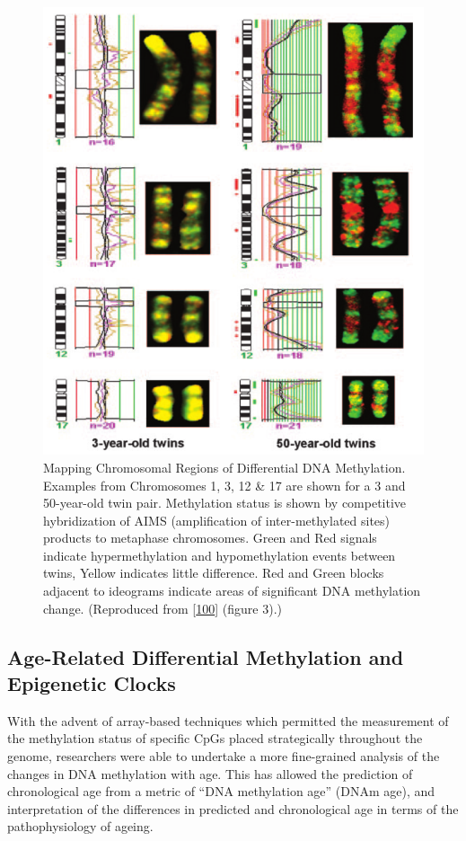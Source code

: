 \documentclass[
]{book}
\begin{document}
\begin{figure}

{\centering \includegraphics[width=0.8\linewidth]{figs/Fraga2005fig3} 

}

\caption{Mapping Chromosomal Regions of Differential DNA Methylation. Examples from Chromosomes 1, 3, 12 \& 17 are shown for a 3 and 50-year-old twin pair. Methylation status is shown by competitive hybridization of AIMS (amplification of inter-methylated sites) products to metaphase chromosomes. Green and Red signals indicate hypermethylation and hypomethylation events between twins, Yellow indicates little difference. Red and Green blocks adjacent to ideograms indicate areas of significant DNA methylation change. (Reproduced from {[}\protect\hyperlink{ref-Fraga2005}{100}{]} (figure 3).)}\label{fig:Fraga2005fig3}
\end{figure}



\hypertarget{DNAmAgeReview}{%
\subsection{Age-Related Differential Methylation and Epigenetic Clocks}\label{DNAmAgeReview}}

With the advent of array-based techniques which permitted the measurement of the methylation status of specific CpGs placed strategically throughout the genome, researchers were able to undertake a more fine-grained analysis of the changes in DNA methylation with age.
This has allowed the prediction of chronological age from a metric of ``DNA methylation age'' (DNAm age), and interpretation of the differences in predicted and chronological age in terms of the pathophysiology of ageing.
\end{document}

